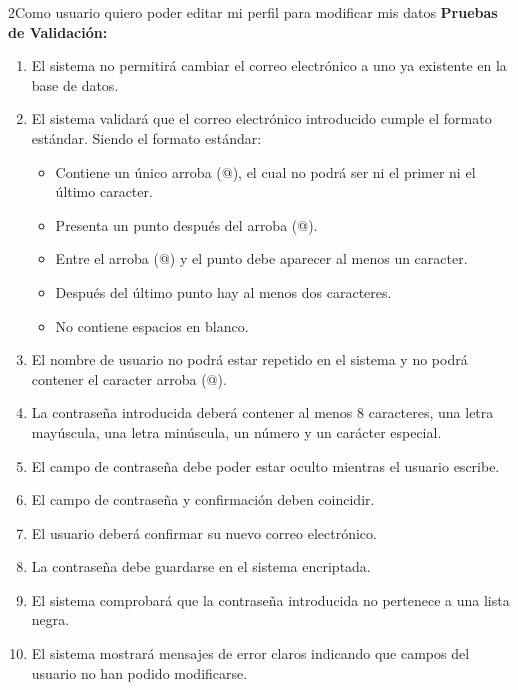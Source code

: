 \begin{hu_card}{2}{Como usuario quiero poder editar mi perfil para modificar mis datos}
    \vspace{2mm}
    \textbf{Pruebas de Validación:}
    \begin{enumerate}[noitemsep, topsep=0pt]
        \item El sistema no permitirá cambiar el correo electrónico a uno ya existente en la base de datos.
        \item El sistema validará que el correo electrónico introducido cumple el formato estándar. Siendo el formato estándar: 
            \begin{itemize}
                \item Contiene un único arroba (@), el cual no podrá ser ni el primer ni el último caracter.
                \item Presenta un punto después del arroba (@).
                \item Entre el arroba (@) y el punto debe aparecer al menos un caracter.
                \item Después del último punto hay al menos dos caracteres.
                \item No contiene espacios en blanco.
            \end{itemize}
        \item El nombre de usuario no podrá estar repetido en el sistema y no podrá contener el caracter arroba (@).
        \item La contraseña introducida deberá contener al menos 8 caracteres, una letra mayúscula, una letra minúscula, un número y un carácter especial.
        \item El campo de contraseña debe poder estar oculto mientras el usuario escribe.
        \item El campo de contraseña y confirmación deben coincidir.
        \item El usuario deberá confirmar su nuevo correo electrónico.
        \item La contraseña debe guardarse en el sistema encriptada.
        \item El sistema comprobará que la contraseña introducida no pertenece a una lista negra.
        \item El sistema mostrará mensajes de error claros indicando que campos del usuario no han podido modificarse.
    \end{enumerate}
\end{hu_card}

